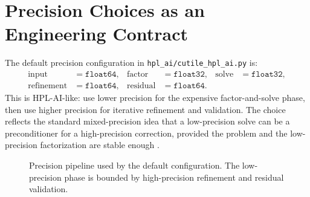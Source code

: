 \documentclass[11pt]{article}
\newcommand{\filecutile}{\texttt{hpl\_ai/cutile\_hpl\_ai.py}}
\begin{document}
\section{Precision Choices as an Engineering Contract}

The default precision configuration in \filecutile{} is:
\begin{align*}
\text{input} &= \texttt{float64}, &
\text{factor} &= \texttt{float32}, &
\text{solve} &= \texttt{float32}, \\
\text{refinement} &= \texttt{float64}, &
\text{residual} &= \texttt{float64}.
\end{align*}
This is HPL-AI-like: use lower precision for the expensive factor-and-solve
phase, then use higher precision for iterative refinement and validation. The
choice reflects the standard mixed-precision idea that a low-precision solve
can be a preconditioner for a high-precision correction, provided the problem
and the low-precision factorization are stable enough \cite{higham-accuracy}.

\begin{figure}[htbp]
\centering
{}
\caption{Precision pipeline used by the default configuration. The low-precision phase is bounded by high-precision refinement and residual validation.}
\label{fig:precision-pipeline}
\end{figure}
\end{document}
